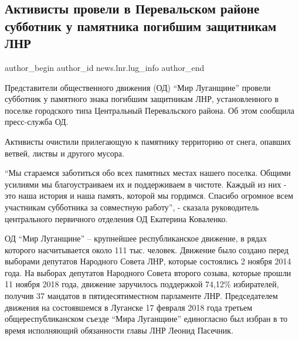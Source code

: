  
 
 
 
 
 
\subsection{Активисты провели в Перевальском районе субботник у памятника погибшим защитникам ЛНР}
\label{sec:28_01_2022.stz.news.lnr.lug_info.3.subbotnik_pamjatnik_zaschitnikam}
 
\ifcmt
 author_begin
   author_id news.lnr.lug_info
 author_end
\fi

Представители общественного движения (ОД) \enquote{Мир Луганщине} провели
субботник у памятного знака погибшим защитникам ЛНР, установленного в поселке
городского типа Центральный Перевальского района. Об этом сообщила пресс-служба
ОД.


Активисты очистили прилегающую к памятнику территорию от снега, опавших ветвей,
листвы и другого мусора.

\enquote{Мы стараемся заботиться обо всех памятных местах нашего поселка.
Общими усилиями мы благоустраиваем их и поддерживаем в чистоте. Каждый из них -
это наша история и наша память, которой мы гордимся. Спасибо огромное всем
участникам субботника за совместную работу}, - сказала руководитель
центрального первичного отделения ОД Екатерина Коваленко.

ОД \enquote{Мир Луганщине} – крупнейшее республиканское движение, в рядах
которого насчитывается около 111 тыс. человек. Движение было создано перед
выборами депутатов Народного Совета ЛНР, которые состоялись 2 ноября 2014 года.
На выборах депутатов Народного Совета второго созыва, которые прошли 11 ноября
2018 года, движение заручилось поддержкой 74,12\% избирателей, получив 37
мандатов в пятидесятиместном парламенте ЛНР. Председателем движения на
состоявшемся в Луганске 17 февраля 2018 года третьем общереспубликанском съезде
\enquote{Мира Луганщине} единогласно был избран в то время исполняющий
обязанности главы ЛНР Леонид Пасечник.
